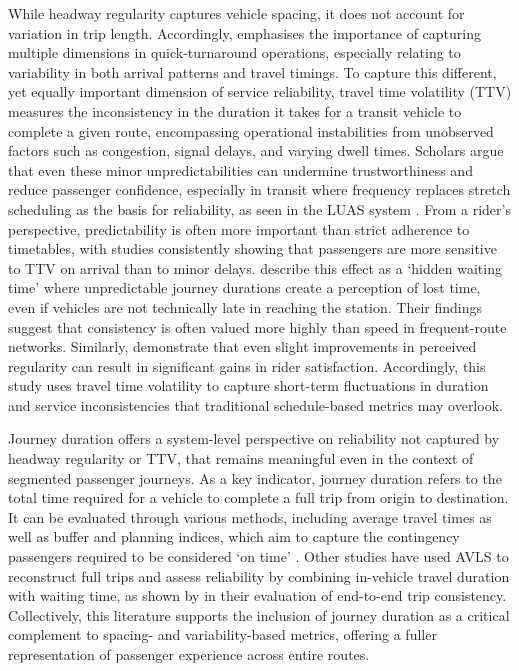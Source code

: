     While headway regularity captures vehicle spacing, it does not account for variation in trip length. Accordingly, \textcite{vanoort2011service} emphasises the importance of capturing multiple dimensions in quick-turnaround operations, especially relating to variability in both arrival patterns and travel timings. To capture this different, yet equally important dimension of service reliability, travel time volatility (TTV) measures the inconsistency in the duration it takes for a transit vehicle to complete a given route, encompassing operational instabilities from unobserved factors such as congestion, signal delays, and varying dwell times. Scholars argue that even these minor unpredictabilities can undermine trustworthiness and reduce passenger confidence, especially in transit where frequency replaces stretch scheduling as the basis for reliability, as seen in the LUAS system \parencite{tirachini2022headway}. From a rider’s perspective, predictability is often more important than strict adherence to timetables, with studies consistently showing that passengers are more sensitive to TTV on arrival than to minor delays. \textcite{benezech2013value} describe this effect as a ‘hidden waiting time’ where unpredictable journey durations create a perception of lost time, even if vehicles are not technically late in reaching the station. Their findings suggest that consistency is often valued more highly than speed in frequent-route networks. Similarly, \textcite{diab2012understanding} demonstrate that even slight improvements in perceived regularity can result in significant gains in rider satisfaction. Accordingly, this study uses travel time volatility to capture short-term fluctuations in duration and service inconsistencies that traditional schedule-based metrics may overlook. 

    Journey duration offers a system-level perspective on reliability not captured by headway regularity or TTV,  that remains meaningful even in the context of segmented passenger journeys. As a key indicator, journey duration refers to the total time required for a vehicle to complete a full trip from origin to destination. It can be evaluated through various methods, including average travel times as well as buffer and planning indices, which aim to capture the contingency passengers required to be considered ‘on time’ \parencite{ma2014measuring}. Other studies have used AVLS to reconstruct full trips and assess reliability by combining in-vehicle travel duration with waiting time, as shown by \textcite{zhang2022prediction} in their evaluation of end-to-end trip consistency. Collectively, this literature supports the inclusion of journey duration as a critical complement to spacing- and variability-based metrics, offering a fuller representation of passenger experience across entire routes.

